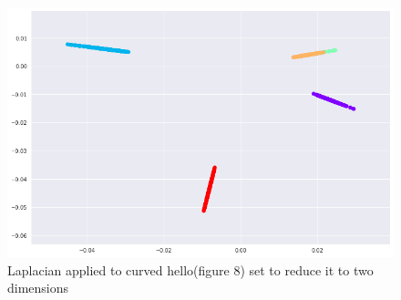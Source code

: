 \documentclass[a4paper]{article}
\begin{document}

\begin{figure}[H]
\centering
\includegraphics[scale = 0.32]{laplacian_part2.png}
\caption{\label{fig:laplacian_part2}Laplacian applied to curved hello(figure 8) set to reduce it to two dimensions}
\end{figure}
\end{document}

